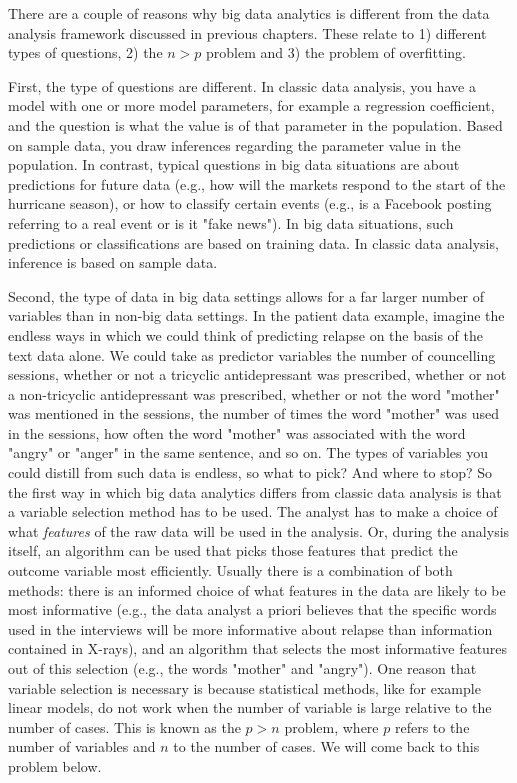 \documentclass[]{book}\usepackage[]{graphicx}\usepackage[]{color}
\begin{document}
There are a couple of reasons why big data analytics is different from the data analysis framework discussed in previous chapters. These relate to 1) different types of questions, 2) the $n>p$ problem and 3) the problem of overfitting.


First, the type of questions are different. In classic data analysis, you have a model with one or more model parameters, for example a regression coefficient, and the question is what the value is of that parameter in the population. Based on sample data, you draw inferences regarding the parameter value in the population. In contrast, typical questions in big data situations are about predictions for future data (e.g., how will the markets respond to the start of the hurricane season), or how to classify certain events (e.g., is a Facebook posting referring to a real event or is it "fake news"). In big data situations, such predictions or classifications are based on training data. In classic data analysis, inference is based on sample data.


Second, the type of data in big data settings allows for a far larger number of variables than in non-big data settings. In the patient data example, imagine the endless ways in which we could think of predicting relapse on the basis of the text data alone. We could take as predictor variables the number of councelling sessions, whether or not a tricyclic antidepressant was prescribed, whether or not a non-tricyclic antidepressant was prescribed, whether or not the word "mother" was mentioned in the sessions, the number of times the word "mother" was used in the sessions, how often the word "mother" was associated with the word "angry" or "anger" in the same sentence, and so on. The types of variables you could distill from such data is endless, so what to pick? And where to stop? So the first way in which big data analytics differs from classic data analysis is that a variable selection method has to be used. The analyst has to make a choice of what \textit{features} of the raw data will be used in the analysis. Or, during the analysis itself, an algorithm can be used that picks those features that predict the outcome variable most efficiently. Usually there is a combination of both methods: there is an informed choice of what features in the data are likely to be most informative (e.g., the data analyst a priori believes that the specific words used in the interviews will be more informative about relapse than information contained in X-rays), and an algorithm that selects the most informative features out of this selection (e.g., the words "mother" and "angry"). One reason that variable selection is necessary is because statistical methods, like for example linear models, do not work when the number of variable is large relative to the number of cases. This is known as the $p > n$ problem, where $p$ refers to the number of variables and $n$ to the number of cases. We will come back to this problem below.
\end{document}
